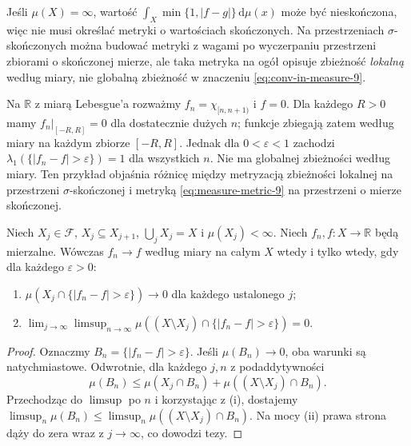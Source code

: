 \begin{uwaga}
Jeśli $\mu(X)=\infty$, wartość
$\int_X\min\{1,|f-g|\}\,\mathrm d\mu(x)$
może być nieskończona, więc nie musi określać
metryki o wartościach skończonych.
Na przestrzeniach $\sigma$-skończonych można budować
metryki z wagami po wyczerpaniu przestrzeni zbiorami
o skończonej mierze, ale taka metryka na ogół
opisuje zbieżność \emph{lokalną} według miary,
nie globalną zbieżność w znaczeniu
\eqref{eq:conv-in-measure-9}.
\end{uwaga}


\begin{przyklad}
\label{ex:local-vs-global-9}
Na $\mathbb R$ z miarą Lebesgue'a rozważmy
$f_n=\chi_{[n,n+1)}$ i $f=0$. Dla każdego
$R>0$ mamy $f_n|_{[-R,R]}=0$ dla dostatecznie
dużych $n$; funkcje zbiegają zatem według miary na
każdym zbiorze $[-R,R]$. Jednak dla $0<\varepsilon<1$
zachodzi $\lambda_1(\{|f_n-f|>\varepsilon\})=1$
dla wszystkich $n$. Nie ma globalnej zbieżności
według miary. Ten przykład objaśnia różnicę między
metryzacją zbieżności lokalnej na przestrzeni
$\sigma$-skończonej i metryką \eqref{eq:measure-metric-9}
na przestrzeni o mierze skończonej.
\end{przyklad}

\begin{twierdzenie}
\label{thm:local-to-global-measure-9}
Niech $X_j\in\mathcal F$, $X_j\subseteq X_{j+1}$,
$\bigcup_jX_j=X$ i $\mu(X_j)<\infty$.
Niech $f_n,f:X\to\mathbb R$ będą mierzalne.
Wówczas $f_n\to f$ według miary na całym $X$
wtedy i tylko wtedy, gdy dla każdego $\varepsilon>0$:
\begin{enumerate}[label=\textup{(\roman*)}]
\item $\mu(X_j\cap\{|f_n-f|>\varepsilon\})\to0$
dla każdego ustalonego $j$;
\item $\displaystyle \lim_{j\to\infty}\limsup_{n\to\infty}
\mu((X\setminus X_j)\cap\{|f_n-f|>\varepsilon\})=0$.
\end{enumerate}
\end{twierdzenie}
\begin{proof}
Oznaczmy $B_n=\{|f_n-f|>\varepsilon\}$.
Jeśli $\mu(B_n)\to0$, oba warunki są natychmiastowe.
Odwrotnie, dla każdego $j,n$ z podaddytywności
\[
\mu(B_n)\le\mu(X_j\cap B_n)+
\mu((X\setminus X_j)\cap B_n).
\]
Przechodząc do $\limsup$ po $n$ i korzystając
z (i), dostajemy
$\limsup_n\mu(B_n)\le
\limsup_n\mu((X\setminus X_j)\cap B_n)$.
Na mocy (ii) prawa strona dąży do zera wraz
z $j\to\infty$, co dowodzi tezy.
\end{proof}

